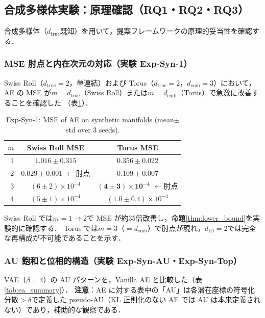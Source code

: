 \documentclass[11pt,a4paper]{jsarticle}
\newcommand{\dID}{d_{\mathrm{ID}}}
\newcommand{\dtrue}{d_{\mathrm{true}}}
\newcommand{\demb}{d_{\mathrm{emb}}}
\begin{document}
\subsection{合成多様体実験：原理確認（RQ1・RQ2・RQ3）}\label{sec:exp_synthetic}

合成多様体（$\dtrue$既知）を用いて，提案フレームワークの原理的妥当性を確認する．

\subsubsection{MSE 肘点と内在次元の対応（実験 Exp-Syn-1）}

Swiss Roll（$\dtrue = 2$，単連結）および Torus（$\dtrue = 2$，$\demb = 3$）において，
AE の MSE が$m = \dtrue$（Swiss Roll）または$m = \demb$（Torus）で急激に改善することを確認した
（表\ref{tab:e1}）．

\begin{table}[H]
\centering
\caption{Exp-Syn-1: MSE of AE on synthetic manifolds (mean$\pm$std over 3 seeds).}
\label{tab:e1}
\small
\begin{tabular}{rcc}
\toprule
$m$ & Swiss Roll MSE & Torus MSE \\
\midrule
1 & $1.016\pm0.315$ & $0.356\pm0.022$ \\
2 & $\boldsymbol{0.029\pm0.001}$ $\leftarrow$肘点 & $0.109\pm0.007$ \\
3 & $(6\pm2)\times10^{-4}$ & $\boldsymbol{(4\pm3)\times10^{-4}}$ $\leftarrow$肘点 \\
4 & $(5\pm1)\times10^{-4}$ & $(1.0\pm0.4)\times10^{-4}$ \\
\bottomrule
\end{tabular}
\end{table}

Swiss Roll では$m = 1 \to 2$で MSE が約35倍改善し，命題\ref{thm:lower_bound}を実験的に確認する．
Torus では$m = 3$（$= \demb$）で肘点が現れ，$\dID = 2$では完全な再構成が不可能であることを示す．

\subsubsection{AU 飽和と位相的構造（実験 Exp-Syn-AU・Exp-Syn-Top）}

VAE（$\beta = 4$）の AU パターンを，Vanilla AE と比較した（表\ref{tab:ea_summary}）．
\textbf{注意}：AE に対する表中の「AU」は各潜在座標の符号化分散$> \delta$で定義した
pseudo-AU（KL 正則化のない AE では AU は本来定義されない）であり，補助的な観察である．
\end{document}
